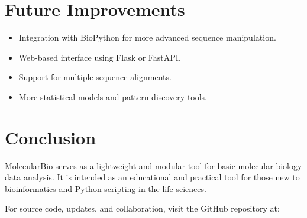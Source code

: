 \documentclass[11pt,a4paper]{article}
\begin{document}
\section{Future Improvements}

\begin{itemize}
  \item Integration with BioPython for more advanced sequence manipulation.
  \item Web-based interface using Flask or FastAPI.
  \item Support for multiple sequence alignments.
  \item More statistical models and pattern discovery tools.
\end{itemize}

\section{Conclusion}

MolecularBio serves as a lightweight and modular tool for basic molecular biology data analysis. It is intended as an educational and practical tool for those new to bioinformatics and Python scripting in the life sciences.

For source code, updates, and collaboration, visit the GitHub repository at:
\end{document}
